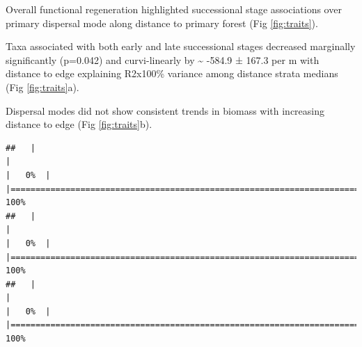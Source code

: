 \documentclass[
  12pt,
]{article}
\begin{document}
Overall functional regeneration highlighted successional stage associations over primary dispersal mode along distance to primary forest
(Fig \ref{fig:traits}).

Taxa associated with both early and late successional stages decreased marginally significantly
(p=0.042)
and curvi-linearly
by
\textasciitilde{} -584.9 ±
167.3 per m
with distance to edge explaining
R2x100\% variance
among distance strata medians
(Fig \ref{fig:traits}a).

Dispersal modes did not show consistent trends in biomass with increasing distance to edge
(Fig \ref{fig:traits}b).

\begin{verbatim}
##   |                                                                              |                                                                      |   0%  |                                                                              |======================================================================| 100%
##   |                                                                              |                                                                      |   0%  |                                                                              |======================================================================| 100%
##   |                                                                              |                                                                      |   0%  |                                                                              |======================================================================| 100%
\end{verbatim}
\end{document}
